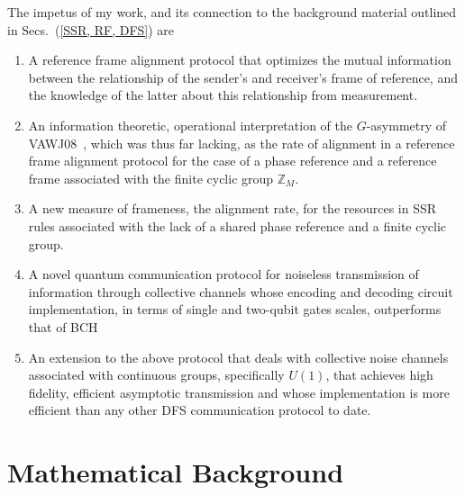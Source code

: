 The impetus of my work, and its connection to the background material outlined in Secs.~(\ref{SSR, RF, DFS}) are  
\begin{enumerate}
\item A reference frame alignment protocol that optimizes the mutual information between the relationship of the sender's and receiver's frame of reference, and the knowledge of the latter about this relationship from measurement.
\item An information theoretic, operational interpretation of the $G$-asymmetry of VAWJ08~\cite{VAWJ08}, which was thus far lacking, as the rate of alignment in a reference frame alignment protocol for the case of a phase reference and a reference frame associated with the finite cyclic group $\mathbb{Z}_M$. 
\item A new measure of frameness, the alignment rate, for the resources in SSR rules associated with the lack of a shared phase reference and a finite cyclic group. 
\item A novel quantum communication protocol for noiseless transmission of information through collective channels whose encoding and decoding circuit implementation, in terms of single and two-qubit gates scales, outperforms that of BCH~\cite{BCH06a,BCH06b}
\item An extension to the above protocol that deals with collective noise channels associated with continuous groups, specifically $U(1)$, that achieves high fidelity, efficient asymptotic transmission and whose implementation is more efficient than any other DFS communication protocol to date.
\end{enumerate}

 
\section{\label{sec:2}Mathematical Background} 
